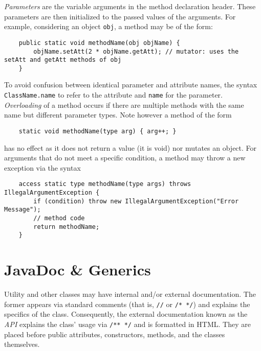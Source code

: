 \documentclass[letterpaper, openany, justified]{tufte-book}
\newcommand{\cd}[1]{\lstinline{#1}}
\begin{document}
\begin{fullwidth}
\bigskip
\emph{Parameters} are the variable arguments in the method declaration header. These parameters are then initialized to the passed values of the arguments. For example, considering an object \cd{obj}, a method may be of the form:
\begin{lstlisting}
    public static void methodName(obj objName) {
        objName.setAtt(2 * objName.getAtt); // mutator: uses the setAtt and getAtt methods of obj
    }
\end{lstlisting}
To avoid confusion between identical parameter and attribute names, the syntax \cd{ClassName.name} to refer to the attribute and \cd{name} for the parameter. \emph{Overloading} of a method occurs if there are multiple methods with the same name but different parameter types. Note however a method of the form
\begin{lstlisting}
    static void methodName(type arg) { arg++; }
\end{lstlisting}
has no effect as it does not return a value (it is void) nor mutates an object. For arguments that do not meet a specific condition, a method may throw a new exception via the syntax
\begin{lstlisting}
    access static type methodName(type args) throws IllegalArgumentException {
        if (condition) throw new IllegalArgumentException("Error Message");
        // method code
        return methodName;
    }
\end{lstlisting}

\section{JavaDoc \& Generics}
Utility and other classes may have internal and/or external documentation. The former appears via standard comments (that is, \cd{//} or \cd{/* */}) and explains the specifics of the class. Consequently, the external documentation known as the \emph{API} explains the class' usage via \cd{/** */} and is formatted in HTML. They are placed before public attributes, constructors, methods, and the classes themselves.


\end{fullwidth}
\end{document}
